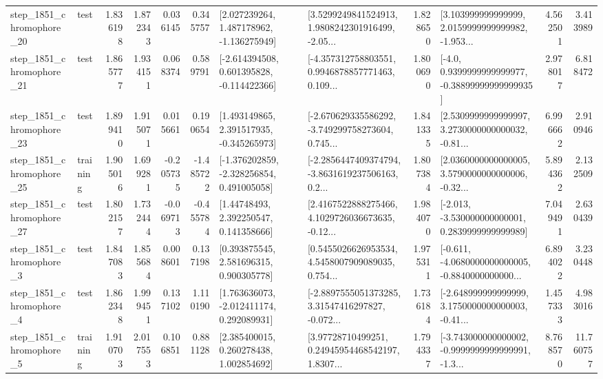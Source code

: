 \begin{tabular}{llrrrrllrlrr}
 step\_1851\_chromophore\_20 &      test &      1.836198 &    1.872343 &      0.036145 &  0.345757 &    [2.027239264, 1.487178962, -1.136275949] &  [3.5299249841524913, 1.9808242301916499, -2.05... &       1.828650 &  [3.103999999999999, 2.0159999999999982, -1.953... &            4.562501 &          3.413989 \\
 step\_1851\_chromophore\_21 &      test &      1.865777 &    1.934151 &      0.068374 &  0.589791 &   [-2.614394508, 0.601395828, -0.114422366] &  [-4.357312758803551, 0.9946878857771463, 0.109... &       1.800690 &   [-4.0, 0.9399999999999977, -0.38899999999999935] &            2.978017 &          6.818472 \\
 step\_1851\_chromophore\_23 &      test &      1.899410 &    1.915071 &      0.015661 &  0.190654 &    [1.493149865, 2.391517935, -0.345265973] &  [-2.670629335586292, -3.749299758273604, 0.745... &       1.841335 &  [2.5309999999999997, 3.2730000000000032, -0.81... &            6.996662 &          2.910946 \\
 step\_1851\_chromophore\_25 &  training &      1.905016 &    1.699281 &     -0.205735 & -1.485722 &   [-1.376202859, -2.328256854, 0.491005058] &  [-2.2856447409374794, -3.8631619237506163, 0.2... &       1.807384 &  [2.0360000000000005, 3.5790000000000006, -0.32... &            5.894362 &          2.132509 \\
 step\_1851\_chromophore\_27 &      test &      1.802157 &    1.732444 &     -0.069713 & -0.455784 &      [1.44748493, 2.392250547, 0.141358666] &  [2.4167522888275466, 4.1029726036673635, -0.12... &       1.984070 &   [-2.013, -3.530000000000001, 0.2839999999999989] &            7.049491 &          2.630439 \\
  step\_1851\_chromophore\_3 &      test &      1.847083 &    1.855684 &      0.008601 &  0.137198 &     [0.393875545, 2.581696315, 0.900305778] &  [0.5455026626953534, 4.5458007909089035, 0.754... &       1.975311 &  [-0.611, -4.0680000000000005, -0.8840000000000... &            6.894022 &          3.230448 \\
  step\_1851\_chromophore\_4 &      test &      1.862348 &    1.999451 &      0.137102 &  1.110190 &    [1.763636073, -2.012411174, 0.292089931] &  [-2.8897555051373285, 3.31547416297827, -0.072... &       1.736184 &  [-2.648999999999999, 3.1750000000000003, -0.41... &            1.457333 &          4.983016 \\
  step\_1851\_chromophore\_5 &  training &      1.910703 &    2.017553 &      0.106851 &  0.881128 &     [2.385400015, 0.260278438, 1.002854692] &  [3.97728710499251, 0.24945954468542197, 1.8307... &       1.794337 &  [-3.743000000000002, -0.9999999999999991, -1.3... &            8.768570 &         11.760757 \\

\end{tabular}
